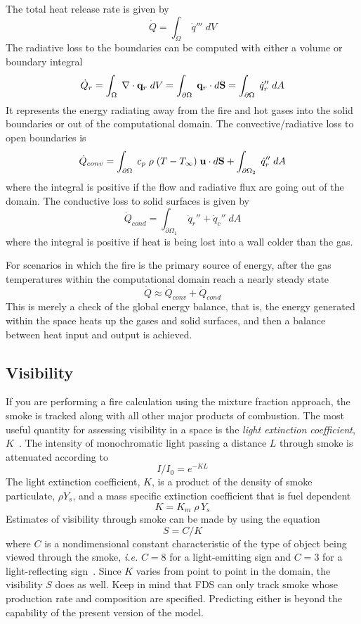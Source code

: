 \documentclass[11pt]{book}
\newcommand{\dS}{{d\bf S}}
\newcommand{\dA}{{dA}}
\newcommand{\bq}{{\bf q}}
\newcommand{\bu}{{\bf u}}
\newcommand{\dq}{\dot{q}}
\newcommand{\be}{\begin{equation}}
\newcommand{\ee}{\end{equation}}
\begin{document}
The total heat release rate is given by
\be \dot{Q} = \int_\Omega \; \dq''' \; dV \ee
The radiative loss to the
boundaries can be computed with either a volume or boundary integral
\be \dot{Q}_r = \int_\Omega \; \nabla \cdot \bq_r \; dV =
\int_{\partial \Omega} \; \bq_r \cdot \dS = \int_{\partial \Omega} \; \dq_r'' \; \dA \ee
It represents the energy radiating away from the fire and hot gases into
the solid boundaries or out of the computational domain. The convective/radiative
loss to open boundaries is
\be \dot{Q}_{conv} =  \int_{\partial \Omega} \; c_p \; \rho \; (T-T_\infty) \; \bu \cdot \dS
   + \int_{\partial \Omega_2} \; \dq_r'' \; \dA  \ee
where the integral is positive if the flow and radiative flux are going out of the domain.
The conductive loss to solid surfaces is given by
\be \dot{Q}_{cond} = \int_{\partial \Omega_1} \; \dq_r'' + \dq_c'' \; \dA  \ee
where the integral is positive if heat is being lost into a wall colder
than the gas.

For scenarios in which the fire is the primary source of energy, after the gas temperatures
within the computational domain reach a nearly steady state
\be \dot{Q} \approx \dot{Q}_{conv} + \dot{Q}_{cond}  \ee
This is merely a check of the global energy balance, that is, the energy generated within the space
heats up the gases and solid surfaces, and then a balance between heat input and output is achieved.



\subsection{Visibility}
\label{info:visibility}

If you are performing a fire calculation using the mixture fraction
approach, the smoke is tracked
along with all other major products of combustion. The most useful
quantity for assessing visibility in a space is the {\em light
extinction coefficient}, $K$~\cite{SFPE:Mulholland}. The intensity of
monochromatic light passing a distance $L$ through smoke
is attenuated according to
\be I/I_0 = e^{-KL} \ee
The light extinction coefficient, $K$, is a product of the
density of smoke particulate, $\rho Y_s$, and a mass specific
extinction coefficient that is fuel dependent
\be K = K_m \; \rho \, Y_s \label{mec} \ee
Estimates of visibility through smoke can be made by using the
equation
\be  S = C/K  \label{vis}  \ee
where $C$ is a nondimensional constant characteristic of
the type of object being viewed through the smoke, {\em i.e.}
$C=8$ for a light-emitting sign and $C=3$ for a light-reflecting
sign~\cite{SFPE:Mulholland}. Since $K$ varies from point to point in the
domain, the visibility $S$ does as well. Keep in mind that
FDS can only track smoke whose production rate and composition
are specified. Predicting either is beyond the
capability of the present version of the model.
\end{document}
